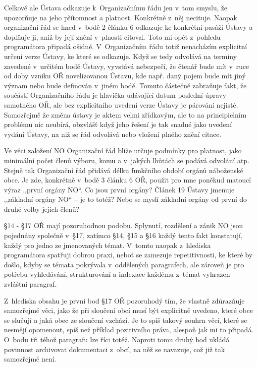 Celkově ale Ústava odkazuje k~Organizačnímu řádu jen v~tom smyslu, že upozorňuje
na jeho přítomnost a platnost. Konkrétně z~něj necituje. Naopak organizační řád
se hned v~bodě 2 článku 6 odkazuje ke konkrétní pasáži Ústavy a doplňuje ji,
aniž by její znění v~plnosti citoval. Toto mi opět z~pohledu programátora
připadá ošidné. V~Organizačním řádu totiž nenacházím explicitní určení verze
Ústavy, ke které se odkazuje. Když se tedy odvolává na termíny zavedené
v~určitém bodě Ústavy, vyvstává nebezpečí, že čtenář bude mít v~ruce od doby
vzniku OŘ novelizovanou Ústavu, kde např. daný pojem bude mít jiný význam nebo
bude definován v~jiném bodě. Tomuto částečně zabraňuje fakt, že součástí
Organizačního řádu je hlavička udávající datum poslední úpravy samotného OŘ, ale
bez explicitního uvedení verze Ústavy je párování nejisté. Samozřejmě že změna
ústavy je aktem velmi zřídkavým, ale to na principielním problému nic neubírá,
obzvlášť když jeho řešení je tak snadné jako uvedení vydání Ústavy, na niž se
řád odvolává nebo vložení plného znění citace.

Ve věci založení NO Organizační řád blíže určuje podmínky pro platnost, jako
minimální počet členů výboru, komu a v~jakých lhůtách se podává odvolání atp.
Stejně tak Organizační řád přidává délku funkčního období orgánů náboženské
obce. Je zde, konkrétně v~bodě 3 článku 6 OŘ, použit pro mne poněkud matoucí
výraz ,,první orgány NO``. Co jsou první orgány? Článek 19 Ústavy jmenuje
,,základní orgány NO`` -- je to totéž? Nebo se myslí základní orgány od první do
druhé volby jejich členů?

§14 - §17 OŘ mají pozoruhodnou podobu. Splynutí, rozdělení a zánik NO jsou
pojednány společně v~§17, zatímco §14, §15 a §16 každý tento fakt konstatují,
každý pro jedno ze jmenovaných témat. V~tomto naopak z~hlediska programátora
spatřuji dobrou praxi, neboť se zamezuje repetitivnosti, ke které by došlo,
kdyby se témata pokrývala v~oddělených paragrafech, ale zároveň je pro potřebu
vyhledávání, strukturování a indexace každému z~témat vyhrazen zvláštní
paragraf.

Z~hlediska obsahu je první bod §17 OŘ pozoruhodý tím, že vlastně zdůrazňuje
samozřejmé věci, jako že při sloučení obcí musí být explicitně uvedeno, které
obce se slučují a jaká obec ze sloučení vzchází. Je to spíš takový souhrn věcí,
které se nesmějí opomenout, spíš než příklad pozitivního práva, alespoň jak mi
to připadá. O~bodu tři téhož paragrafu lze říci totéž. Naproti tomu druhý bod
ukládá povinnost archivovat dokumentaci z~obcí, na něž se navazuje, což již tak
samozřejmé není.

